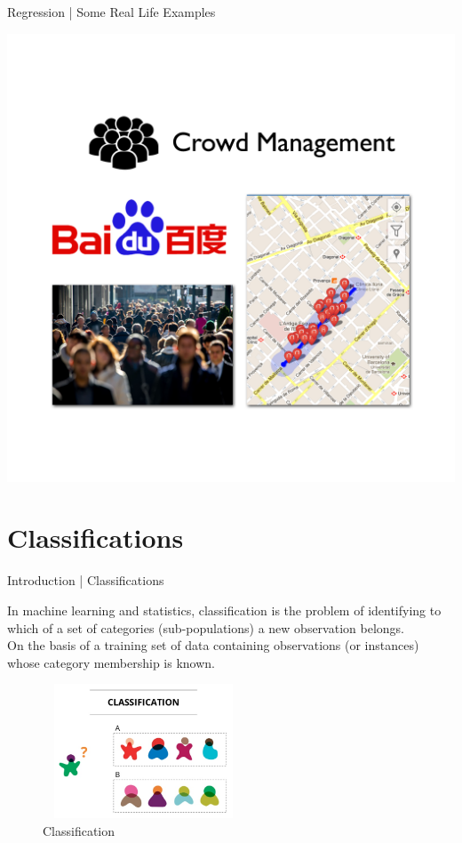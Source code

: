 \documentclass[10pt]{beamer}
\begin{document}
	\begin{frame}{Regression | Some Real Life Examples}
		\begin{center}
			\vspace{-10mm}
			\includegraphics[scale=0.2]{images/crow}
		\end{center}
	\end{frame}
	
	\section{Classifications}
	\begin{frame}{Introduction | Classifications}
		\begin{center}
			\large{In machine learning and statistics, classification is the problem of identifying to which of a set of categories (sub-populations) a new observation belongs.}\\
			\bigskip
			\small{ On the basis of a training set of data containing observations (or instances) whose category 							membership is known.}
			\begin{figure}
				\centering
				\includegraphics[width=60mm,height=40mm]{images/barun_1}
				\caption[]{Classification}
			\end{figure}
		\end{center}
		
	\end{frame}
\end{document}
